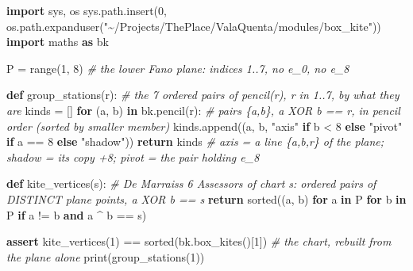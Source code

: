 \documentclass[
  10pt,
]{article}
\newenvironment{Shaded}{}{}
\newcommand{\BuiltInTok}[1]{\textcolor[rgb]{0.00,0.50,0.00}{#1}}
\newcommand{\CommentTok}[1]{\textcolor[rgb]{0.38,0.63,0.69}{\textit{#1}}}
\newcommand{\ControlFlowTok}[1]{\textcolor[rgb]{0.00,0.44,0.13}{\textbf{#1}}}
\newcommand{\DecValTok}[1]{\textcolor[rgb]{0.25,0.63,0.44}{#1}}
\newcommand{\ImportTok}[1]{\textcolor[rgb]{0.00,0.50,0.00}{\textbf{#1}}}
\newcommand{\KeywordTok}[1]{\textcolor[rgb]{0.00,0.44,0.13}{\textbf{#1}}}
\newcommand{\NormalTok}[1]{#1}
\newcommand{\OperatorTok}[1]{\textcolor[rgb]{0.40,0.40,0.40}{#1}}
\newcommand{\StringTok}[1]{\textcolor[rgb]{0.25,0.44,0.63}{#1}}
\begin{document}
\begin{Shaded}
\begin{Highlighting}[]
\ImportTok{import}\NormalTok{ sys, os}
\NormalTok{sys.path.insert(}\DecValTok{0}\NormalTok{, os.path.expanduser(}\StringTok{"\textasciitilde{}/Projects/ThePlace/ValaQuenta/modules/box\_kite"}\NormalTok{))}
\ImportTok{import}\NormalTok{ maths }\ImportTok{as}\NormalTok{ bk}

\NormalTok{P }\OperatorTok{=} \BuiltInTok{range}\NormalTok{(}\DecValTok{1}\NormalTok{, }\DecValTok{8}\NormalTok{)                                   }\CommentTok{\# the lower Fano plane: indices 1..7, no e\_0, no e\_8}

\KeywordTok{def}\NormalTok{ group\_stations(r):                            }\CommentTok{\# the 7 ordered pairs of pencil(r), r in 1..7, by what they are}
\NormalTok{    kinds }\OperatorTok{=}\NormalTok{ []}
    \ControlFlowTok{for}\NormalTok{ (a, b) }\KeywordTok{in}\NormalTok{ bk.pencil(r):                   }\CommentTok{\# pairs \{a,b\}, a XOR b == r, in pencil order (sorted by smaller member)}
\NormalTok{        kinds.append((a, b, }\StringTok{"axis"} \ControlFlowTok{if}\NormalTok{ b }\OperatorTok{\textless{}} \DecValTok{8} \ControlFlowTok{else} \StringTok{"pivot"} \ControlFlowTok{if}\NormalTok{ a }\OperatorTok{==} \DecValTok{8} \ControlFlowTok{else} \StringTok{"shadow"}\NormalTok{))}
    \ControlFlowTok{return}\NormalTok{ kinds                                  }\CommentTok{\# axis = a line \{a,b,r\} of the plane; shadow = its copy +8; pivot = the pair holding e\_8}

\KeywordTok{def}\NormalTok{ kite\_vertices(s):                             }\CommentTok{\# De Marrais\textquotesingle{}s 6 Assessors of chart s: ordered pairs of DISTINCT plane points, a XOR b == s}
    \ControlFlowTok{return} \BuiltInTok{sorted}\NormalTok{((a, b) }\ControlFlowTok{for}\NormalTok{ a }\KeywordTok{in}\NormalTok{ P }\ControlFlowTok{for}\NormalTok{ b }\KeywordTok{in}\NormalTok{ P }\ControlFlowTok{if}\NormalTok{ a }\OperatorTok{!=}\NormalTok{ b }\KeywordTok{and}\NormalTok{ a }\OperatorTok{\^{}}\NormalTok{ b }\OperatorTok{==}\NormalTok{ s)}

\ControlFlowTok{assert}\NormalTok{ kite\_vertices(}\DecValTok{1}\NormalTok{) }\OperatorTok{==} \BuiltInTok{sorted}\NormalTok{(bk.box\_kites()[}\DecValTok{1}\NormalTok{])                      }\CommentTok{\# the chart, rebuilt from the plane alone}
\BuiltInTok{print}\NormalTok{(group\_stations(}\DecValTok{1}\NormalTok{))}
\end{Highlighting}
\end{Shaded}
\end{document}
